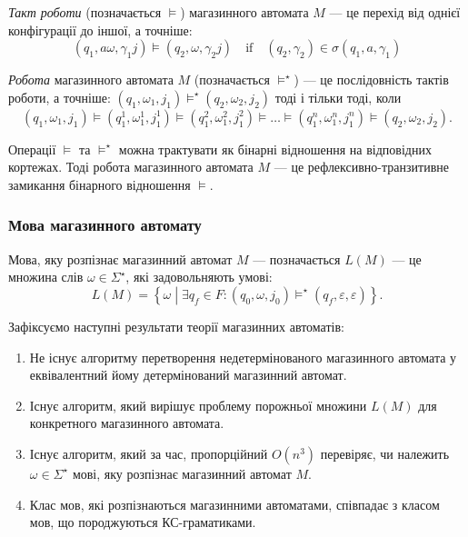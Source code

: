 \textit{Такт роботи} (позначається $\models$) магазинного автомата $M$ --- це перехід від однієї конфігурації до іншої, а точніше:
\begin{equation}
	(q_1, a \omega, \gamma_1 j) \models (q_2, \omega, \gamma_2 j) \quad\text{if}\quad (q_2, \gamma_2) \in \sigma(q_1, a, \gamma_1)
\end{equation}

\textit{Робота} магазинного автомата $M$ (позначається $\models^\star$) --- це послідовність тактів роботи, а точніше: $(q_1, \omega_1, j_1) \models^\star (q_2, \omega_2, j_2)$ тоді і тільки тоді, коли
\begin{equation}
	(q_1, \omega_1, j_1) \models (q_1^1, \omega_1^1, j_1^1) \models (q_1^2, \omega_1^2, j_1^2) \models \ldots \models (q_1^n, \omega_1^n, j_1^n) \models (q_2, \omega_2, j_2).
\end{equation}

Операції $\models$ та $\models^\star$ можна трактувати як бінарні відношення на відповідних кортежах. Тоді робота магазинного автомата $M$ --- це рефлексивно-транзитивне замикання бінарного відношення $\models$.

\subsubsection{Мова магазинного автомату}

Мова, яку розпізнає магазинний автомат $M$ --- позначається $L(M)$ --- це множина слів $\omega \in \Sigma^\star$, які задовольняють умові:
\begin{equation}
	L(M) = \left\{ \omega \middle| \exists q_f \in F: (q_0, \omega, j_0) \models^\star (q_f, \varepsilon, \varepsilon) \right\}.
\end{equation}

Зафіксуємо наступні результати теорії магазинних автоматів:
\begin{enumerate}
	\item Не існує алгоритму перетворення недетермінованого магазинного автомата у еквівалентний йому детермінований магазинний автомат.
	\item Існує алгоритм, який вирішує проблему порожньої множини $L(M)$ для конкретного магазинного автомата.
	\item Існує алгоритм, який за час, пропорційний $O(n^3)$ перевіряє, чи належить $\omega \in \Sigma^\star$ мові, яку розпізнає магазинний автомат $M$.
	\item Клас мов, які розпізнаються магазинними автоматами, співпадає з класом мов, що породжуються КС-граматиками.
\end{enumerate}

